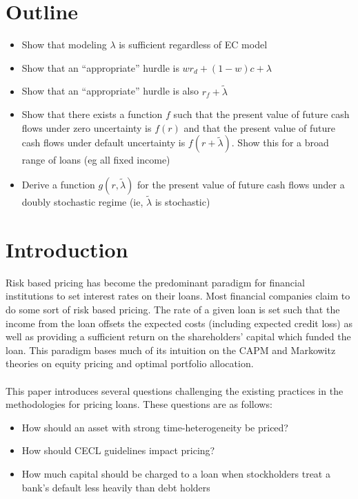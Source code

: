 \documentclass{article}
\begin{document}


\section{Outline}
\begin{itemize}
\item Show that modeling \(\lambda\) is sufficient regardless of EC model
\item Show that an ``appropriate'' hurdle is \(w r_d + (1-w)c+\lambda\)
\item Show that an ``appropriate'' hurdle is also \(r_f+\tilde{\lambda}\)
\item Show that there exists a function \(f\) such that the present value of future cash flows under zero uncertainty is \(f(r)\) and that the present value of future cash flows under default uncertainty is \(f(r+\tilde{\lambda})\).  Show this for a broad range of loans (eg all fixed income)
\item Derive a function \(g(r, \tilde{\lambda})\) for the present value of future cash flows under a doubly stochastic regime (ie, \(\tilde{\lambda}\) is stochastic)
\end{itemize}

\section{Introduction}
Risk based pricing has become the predominant paradigm for financial institutions to set interest rates on their loans.  Most financial companies claim to do some sort of risk based pricing.  The rate of a given loan is set such that the income from the loan offsets the expected costs (including expected credit loss) as well as providing a sufficient return on the shareholders' capital which funded the loan.  This paradigm bases much of its intuition on the CAPM and Markowitz theories on equity pricing and optimal portfolio allocation.  
\\
\\
This paper introduces several questions challenging the existing practices in the methodologies for pricing loans.  These questions are as follows:
\begin{itemize}
\item How should an asset with strong time-heterogeneity be priced?  
\item How should CECL guidelines impact pricing? 
\item How much capital should be charged to a loan when stockholders treat a bank's default less heavily than debt holders
\end{itemize}
\end{document}
